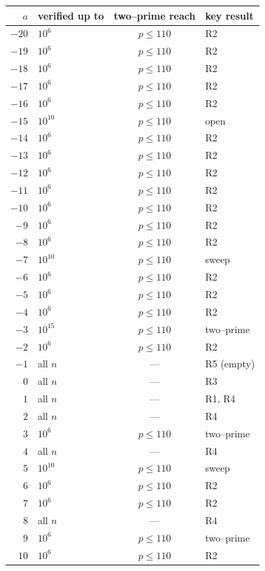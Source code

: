 \documentclass[11pt,reqno]{amsart}
\theoremstyle{plain}
\theoremstyle{definition}
\theoremstyle{remark}
\begin{document}
\begin{table}[H]
\centering
\small
\begin{tabular}{r l c l}
\toprule
$a$ & verified up to & two--prime reach & key result\\
\midrule
$-20$ & $10^{6}$ & $p\le110$ & R2 \\
$-19$ & $10^{6}$ & $p\le110$ & R2 \\
$-18$ & $10^{6}$ & $p\le110$ & R2 \\
$-17$ & $10^{6}$ & $p\le110$ & R2 \\
$-16$ & $10^{6}$ & $p\le110$ & R2 \\
$-15$ & $10^{10}$ & $p\le110$ & open \\
$-14$ & $10^{6}$ & $p\le110$ & R2 \\
$-13$ & $10^{6}$ & $p\le110$ & R2 \\
$-12$ & $10^{6}$ & $p\le110$ & R2 \\
$-11$ & $10^{6}$ & $p\le110$ & R2 \\
$-10$ & $10^{6}$ & $p\le110$ & R2 \\
$-9$ & $10^{6}$ & $p\le110$ & R2 \\
$-8$ & $10^{6}$ & $p\le110$ & R2 \\
$-7$ & $10^{10}$ & $p\le110$ & sweep \\
$-6$ & $10^{6}$ & $p\le110$ & R2 \\
$-5$ & $10^{6}$ & $p\le110$ & R2 \\
$-4$ & $10^{6}$ & $p\le110$ & R2 \\
$-3$ & $10^{15}$ & $p\le110$ & two--prime \\
$-2$ & $10^{6}$ & $p\le110$ & R2 \\
$-1$ & all $n$ & --- & R5 (empty) \\
$0$ & all $n$ & --- & R3 \\
$1$ & all $n$ & --- & R1, R4 \\
$2$ & all $n$ & --- & R4 \\
$3$ & $10^{6}$ & $p\le110$ & two--prime \\
$4$ & all $n$ & --- & R4 \\
$5$ & $10^{10}$ & $p\le110$ & sweep \\
$6$ & $10^{6}$ & $p\le110$ & R2 \\
$7$ & $10^{6}$ & $p\le110$ & R2 \\
$8$ & all $n$ & --- & R4 \\
$9$ & $10^{6}$ & $p\le110$ & two--prime \\
$10$ & $10^{6}$ & $p\le110$ & R2 \\

\end{tabular}
\end{table}
\end{document}
